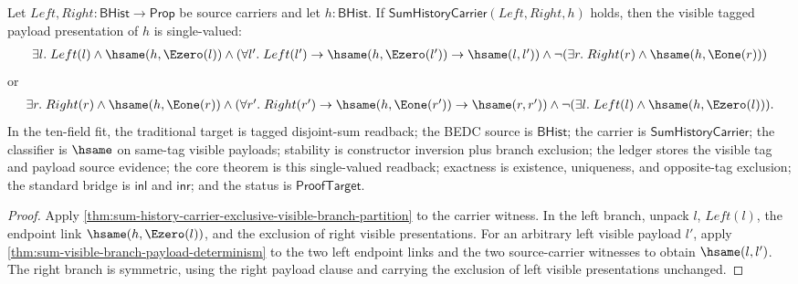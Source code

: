 \begin{theorem}
\label{thm:sum-history-carrier-single-valued-visible-readback}
Let $Left,Right:\mathsf{BHist}\to\mathsf{Prop}$ be source carriers and let
$h:\mathsf{BHist}$. If $\mathsf{SumHistoryCarrier}(Left,Right,h)$ holds, then
the visible tagged payload presentation of $h$ is single-valued:
$$
\begin{array}{l}
\exists l.\; Left(l)\land \hsame(h,\Ezero(l))\land
(\forall l'.\; Left(l')\to \hsame(h,\Ezero(l'))\to \hsame(l,l'))\land
\neg(\exists r.\; Right(r)\land \hsame(h,\Eone(r)))
\end{array}
$$
or
$$
\begin{array}{l}
\exists r.\; Right(r)\land \hsame(h,\Eone(r))\land
(\forall r'.\; Right(r')\to \hsame(h,\Eone(r'))\to \hsame(r,r'))\land
\neg(\exists l.\; Left(l)\land \hsame(h,\Ezero(l))).
\end{array}
$$
In the ten-field fit, the traditional target is tagged disjoint-sum readback;
the BEDC source is $\mathsf{BHist}$; the carrier is
$\mathsf{SumHistoryCarrier}$; the classifier is $\hsame$ on same-tag visible
payloads; stability is constructor inversion plus branch exclusion; the ledger
stores the visible tag and payload source evidence; the core theorem is this
single-valued readback; exactness is existence, uniqueness, and opposite-tag
exclusion; the standard bridge is $\mathsf{inl}$ and $\mathsf{inr}$; and the
status is $\mathsf{ProofTarget}$.
\end{theorem}
\begin{proof}
Apply \autoref{thm:sum-history-carrier-exclusive-visible-branch-partition} to
the carrier witness. In the left branch, unpack $l$, $Left(l)$, the endpoint
link $\hsame(h,\Ezero(l))$, and the exclusion of right visible presentations.
For an arbitrary left visible payload $l'$, apply
\autoref{thm:sum-visible-branch-payload-determinism} to the two left endpoint
links and the two source-carrier witnesses to obtain $\hsame(l,l')$. The right
branch is symmetric, using the right payload clause and carrying the exclusion
of left visible presentations unchanged.
\end{proof}

